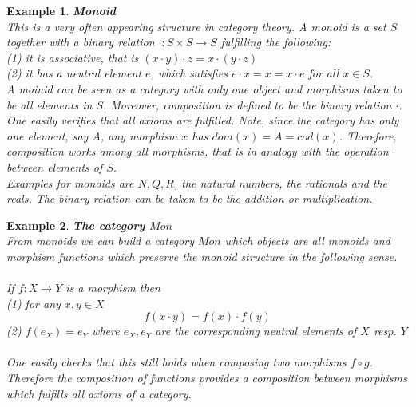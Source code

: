 \documentclass[17pt]{extarticle}
\newtheorem{example}{Example}
\begin{document}
\begin{example}
	\textbf{Monoid}\\
	This is a very often appearing structure in category theory. A monoid is a set $S$ together with a binary relation $\cdot:S\times S\rightarrow S$ fulfilling the following:\\ 
	(1) it is associative, that is $(x\cdot y)\cdot z = x\cdot (y\cdot z)$\\
	(2) it has a neutral element $e$, which satisfies $e\cdot x=x=x\cdot e$ for all $x\in S$.\\
	
	A moinid can be seen as a category with only one object and morphisms taken to be all elements in $S$. Moreover, composition is defined to be the binary relation $\cdot$.
	One easily verifies that all axioms are fulfilled. Note, since the category has only one element, say $A$, any morphism $x$ has $dom(x)=A=cod(x)$. Therefore, composition works among all morphisms, that is in analogy with the operation $\cdot$ between elements of $S$.\\
	Examples for monoids are $N, Q, R$, the natural numbers, the rationals and the reals.
	The binary relation can be taken to be the addition or multiplication.
\end{example}

\begin{example}
	\textbf{The category $Mon$}\\
	From monoids we can build a category $Mon$ which objects are all monoids and morphism functions which preserve the monoid structure in the following sense.\\ \\
	 If $f:X\rightarrow Y$ is a morphism then \\ 
	(1) for any $x,y\in X$
	$$
	f(x\cdot y)=f(x)\cdot f(y)
	$$
	(2) $f(e_X)=e_Y$ where $e_X, e_Y$ are the corresponding neutral elements of $X$ resp. $Y$ \\ \\
	One easily checks that this still holds when composing two morphisms $f\circ g$. Therefore the composition of functions provides a composition between morphisms which fulfills all axioms of a category.\\	
\end{example}
\end{document}
